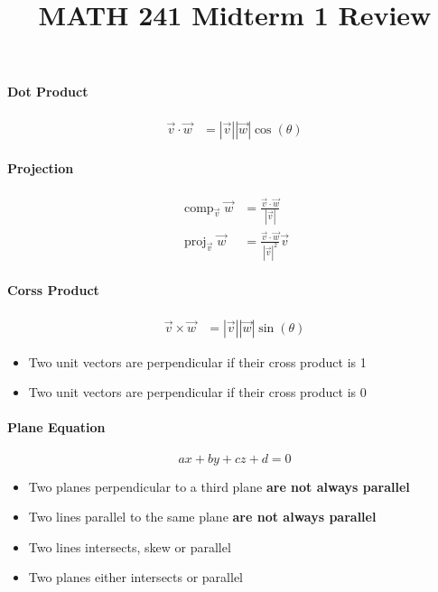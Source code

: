 \documentclass[11pt]{article}
\title{MATH 241 Midterm 1 Review}
\DeclareMathOperator{\proj}{proj}
\DeclareMathOperator{\comp}{comp}
\begin{document}
  \maketitle

  \paragraph{Dot Product}
  \begin{align}
    \vec{v} \cdot \vec{w} &= \left| \vec{v} \right| \left| \vec{w} \right| \cos\left( \theta \right)
  \end{align}

  \paragraph{Projection}
  \begin{align}
    \comp_{\vec{v}} \vec{w} &= \frac{ \vec{v} \cdot \vec{w} }{ \left| \vec{v} \right| } \\
    \proj_{\vec{v}} \vec{w} &= \frac{ \vec{v} \cdot \vec{w} }{ \left| \vec{v} \right|^{2} } \vec{v}
  \end{align}

  \paragraph{Corss Product}
  \begin{align}
    \vec{v} \times \vec{w} &= \left| \vec{v} \right| \left| \vec{w} \right| \sin\left( \theta \right)
  \end{align}

  \begin{itemize}
    \item Two unit vectors are perpendicular if their cross product is 1
    \item Two unit vectors are perpendicular if their cross product is 0
  \end{itemize}

  \paragraph{Plane Equation}
  \begin{equation}
    ax + by + cz + d = 0
  \end{equation}

  \begin{itemize}
    \item Two planes perpendicular to a third plane \textbf{are not always parallel}
    \item Two lines parallel to the same plane \textbf{are not always parallel}
    \item Two lines intersects, skew or parallel
    \item Two planes either intersects or parallel
  \end{itemize}
\end{document}
